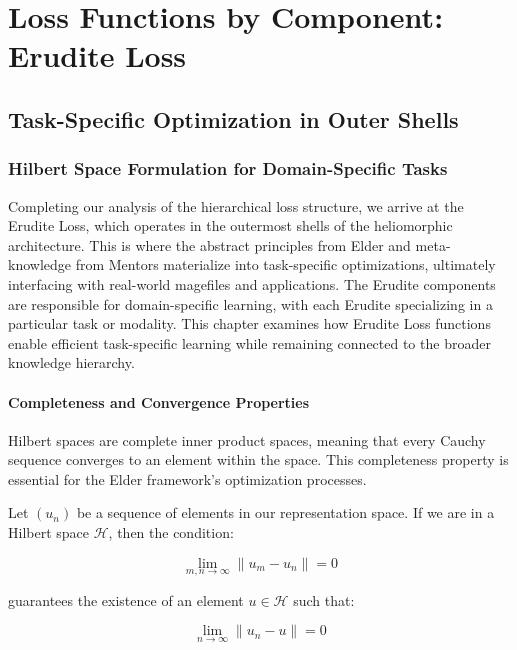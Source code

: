 \chapter{Loss Functions by Component: Erudite Loss}

\section{Task-Specific Optimization in Outer Shells}

\subsection{Hilbert Space Formulation for Domain-Specific Tasks}

Completing our analysis of the hierarchical loss structure, we arrive at the Erudite Loss, which operates in the outermost shells of the heliomorphic architecture. This is where the abstract principles from Elder and meta-knowledge from Mentors materialize into task-specific optimizations, ultimately interfacing with real-world magefiles and applications. The Erudite components are responsible for domain-specific learning, with each Erudite specializing in a particular task or modality. This chapter examines how Erudite Loss functions enable efficient task-specific learning while remaining connected to the broader knowledge hierarchy.

\subsubsection{Completeness and Convergence Properties}

Hilbert spaces are complete inner product spaces, meaning that every Cauchy sequence converges to an element within the space. This completeness property is essential for the Elder framework's optimization processes.

Let $(u_n)$ be a sequence of elements in our representation space. If we are in a Hilbert space $\mathcal{H}$, then the condition:

\begin{equation}
\lim_{m,n \to \infty} \|u_m - u_n\| = 0
\end{equation}

guarantees the existence of an element $u \in \mathcal{H}$ such that:

\begin{equation}
\lim_{n \to \infty} \|u_n - u\| = 0
\end{equation}


